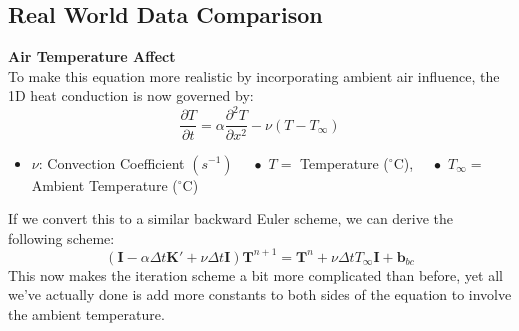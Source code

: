 \documentclass[11pt]{article}
\begin{document}
\begin{onehalfspace}
\section*{Real World Data Comparison}

    \noindent
    \textbf{Air Temperature Affect} \\
    \noindent
    To make this equation more realistic by incorporating ambient air influence, the 1D heat conduction is now governed by:
    \[\frac{\partial T}{\partial t} = \alpha \frac{\partial^2 T}{\partial x^2} - \nu(T - T_\infty)\]
    \begin{itemize}
        \item $\nu$: Convection Coefficient $(s^{-1})$ $\quad \bullet$ $T =$ Temperature ($^\circ$C), $\quad \bullet$ $T_{\infty} =$ Ambient Temperature ($^\circ$C)
    \end{itemize}
    If we convert this to a similar backward Euler scheme, we can derive the following scheme:
    \[(\mathbf{I} - \alpha \Delta t \mathbf{K}' + \nu \Delta t \mathbf{I}) \mathbf{T}^{n+1} = \mathbf{T}^{n} + \nu \Delta t T_\infty\mathbf{I} + \mathbf{b}_{bc}\]
    This now makes the iteration scheme a bit more complicated than before, yet all we've actually done is add more constants to both sides of the equation to involve the ambient temperature. \\
    

\end{onehalfspace}
\end{document}
